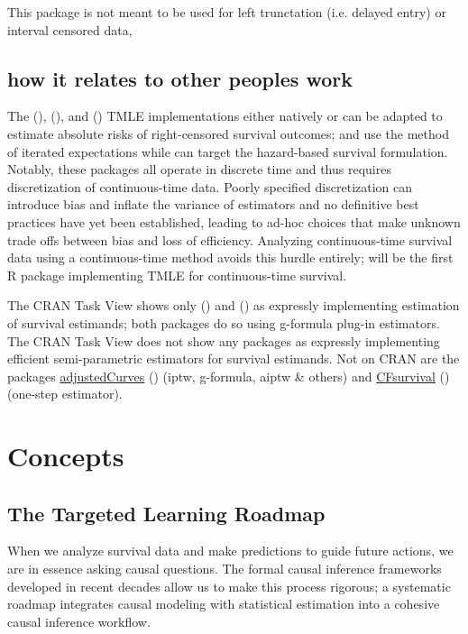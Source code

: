 \documentclass{report}
\newcommand{\1}{\ensuremath{\mathbf{1}}}
\begin{document}
This package is not meant to be used for left trunctation (i.e. delayed entry) or interval censored data, 

\subsection{how it relates to other peoples work}
\label{sec:org2ed371d}

The  (\cite{schwab_ltmle_2020}),  (\cite{sofrygin_stremr_2017}), and  (\cite{benkeser_survtmle_2019}) TMLE implementations either natively or can be adapted to estimate absolute risks of right-censored survival outcomes;  and  use the method of iterated expectations while  can target the hazard-based survival formulation. Notably, these packages all operate in discrete time and thus requires discretization of continuous-time data. Poorly specified discretization can introduce bias and inflate the variance of estimators and no definitive best practices have yet been established, leading to ad-hoc choices that make unknown trade offs between bias and loss of efficiency. Analyzing continuous-time survival data using a continuous-time method avoids this hurdle entirely;  will be the first R package implementing TMLE for continuous-time survival.

The  CRAN Task View shows only  (\cite{gerds_riskregression_2022}) and  (\cite{wallace_dtrreg_2020}) as expressly implementing estimation of survival estimands; both packages do so using g-formula plug-in estimators. The  CRAN Task View does not show any packages as expressly implementing efficient semi-parametric estimators for survival estimands. Not on CRAN are the packages \href{https://github.com/RobinDenz1/adjustedCurves}{adjustedCurves} (\cite{denz_comparison_2022}) (iptw, g-formula, aiptw \& others) and \href{https://github.com/tedwestling/CFsurvival}{CFsurvival} (\cite{westling_inference_2021}) (one-step estimator). 


\section{Concepts}
\label{sec:orga6cf914}

\subsection{The Targeted Learning Roadmap}
\label{sec:org89b1abd}
When we analyze survival data and make predictions to guide future actions, we are in essence asking causal questions. The formal causal inference frameworks developed in recent decades allow us to make this process rigorous; a systematic roadmap \cite{petersen_causal_2014} integrates causal modeling with statistical estimation into a cohesive causal inference workflow.
\end{document}
